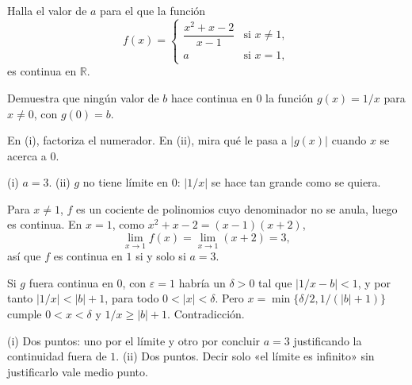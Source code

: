 %

\begin{exercise}
\begin{parts}
  \item Halla el valor de $a$ para el que la función
        \[
          f(x) =
          \begin{cases}
            \dfrac{x^2 + x - 2}{x - 1} & \text{si } x \neq 1, \\[1ex]
            a & \text{si } x = 1,
          \end{cases}
        \]
        es continua en $\mathbb{R}$.
  \item Demuestra que ningún valor de $b$ hace continua en $0$ la función
        $g(x) = 1/x$ para $x \neq 0$, con $g(0) = b$.
\end{parts}

\answerspace{6cm}

\begin{hint}
En (i), factoriza el numerador. En (ii), mira qué le pasa a $|g(x)|$ cuando
$x$ se acerca a $0$.
\end{hint}

\begin{answer}
(i) $a = 3$. (ii) $g$ no tiene límite en $0$: $|1/x|$ se hace tan grande como
se quiera.
\end{answer}

\begin{solution}
\begin{parts}
  \item Para $x \neq 1$, $f$ es un cociente de polinomios cuyo denominador no
        se anula, luego es continua. En $x = 1$, como
        $x^2 + x - 2 = (x - 1)(x + 2)$,
        \[
          \lim_{x \to 1} f(x) = \lim_{x \to 1} (x + 2) = 3 ,
        \]
        así que $f$ es continua en $1$ si y solo si $a = 3$.
  \item Si $g$ fuera continua en $0$, con $\varepsilon = 1$ habría un
        $\delta > 0$ tal que $|1/x - b| < 1$, y por tanto
        $|1/x| < |b| + 1$, para todo $0 < |x| < \delta$. Pero
        $x = \min\{\delta/2, 1/(|b| + 1)\}$ cumple $0 < x < \delta$ y
        $1/x \geq |b| + 1$. Contradicción.
\end{parts}
\end{solution}

\begin{marking}
(i) Dos puntos: uno por el límite y otro por concluir $a = 3$ justificando la
continuidad fuera de $1$. (ii) Dos puntos. Decir solo «el límite es infinito»
sin justificarlo vale medio punto.
\end{marking}
\end{exercise}
